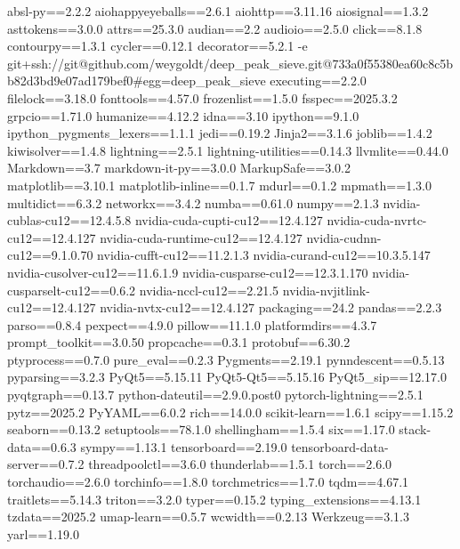 absl-py==2.2.2
aiohappyeyeballs==2.6.1
aiohttp==3.11.16
aiosignal==1.3.2
asttokens==3.0.0
attrs==25.3.0
audian==2.2
audioio==2.5.0
click==8.1.8
contourpy==1.3.1
cycler==0.12.1
decorator==5.2.1
-e git+ssh://git@github.com/weygoldt/deep_peak_sieve.git@733a0f55380ea60c8c5bb82d3bd9e07ad179bef0#egg=deep_peak_sieve
executing==2.2.0
filelock==3.18.0
fonttools==4.57.0
frozenlist==1.5.0
fsspec==2025.3.2
grpcio==1.71.0
humanize==4.12.2
idna==3.10
ipython==9.1.0
ipython_pygments_lexers==1.1.1
jedi==0.19.2
Jinja2==3.1.6
joblib==1.4.2
kiwisolver==1.4.8
lightning==2.5.1
lightning-utilities==0.14.3
llvmlite==0.44.0
Markdown==3.7
markdown-it-py==3.0.0
MarkupSafe==3.0.2
matplotlib==3.10.1
matplotlib-inline==0.1.7
mdurl==0.1.2
mpmath==1.3.0
multidict==6.3.2
networkx==3.4.2
numba==0.61.0
numpy==2.1.3
nvidia-cublas-cu12==12.4.5.8
nvidia-cuda-cupti-cu12==12.4.127
nvidia-cuda-nvrtc-cu12==12.4.127
nvidia-cuda-runtime-cu12==12.4.127
nvidia-cudnn-cu12==9.1.0.70
nvidia-cufft-cu12==11.2.1.3
nvidia-curand-cu12==10.3.5.147
nvidia-cusolver-cu12==11.6.1.9
nvidia-cusparse-cu12==12.3.1.170
nvidia-cusparselt-cu12==0.6.2
nvidia-nccl-cu12==2.21.5
nvidia-nvjitlink-cu12==12.4.127
nvidia-nvtx-cu12==12.4.127
packaging==24.2
pandas==2.2.3
parso==0.8.4
pexpect==4.9.0
pillow==11.1.0
platformdirs==4.3.7
prompt_toolkit==3.0.50
propcache==0.3.1
protobuf==6.30.2
ptyprocess==0.7.0
pure_eval==0.2.3
Pygments==2.19.1
pynndescent==0.5.13
pyparsing==3.2.3
PyQt5==5.15.11
PyQt5-Qt5==5.15.16
PyQt5_sip==12.17.0
pyqtgraph==0.13.7
python-dateutil==2.9.0.post0
pytorch-lightning==2.5.1
pytz==2025.2
PyYAML==6.0.2
rich==14.0.0
scikit-learn==1.6.1
scipy==1.15.2
seaborn==0.13.2
setuptools==78.1.0
shellingham==1.5.4
six==1.17.0
stack-data==0.6.3
sympy==1.13.1
tensorboard==2.19.0
tensorboard-data-server==0.7.2
threadpoolctl==3.6.0
thunderlab==1.5.1
torch==2.6.0
torchaudio==2.6.0
torchinfo==1.8.0
torchmetrics==1.7.0
tqdm==4.67.1
traitlets==5.14.3
triton==3.2.0
typer==0.15.2
typing_extensions==4.13.1
tzdata==2025.2
umap-learn==0.5.7
wcwidth==0.2.13
Werkzeug==3.1.3
yarl==1.19.0
